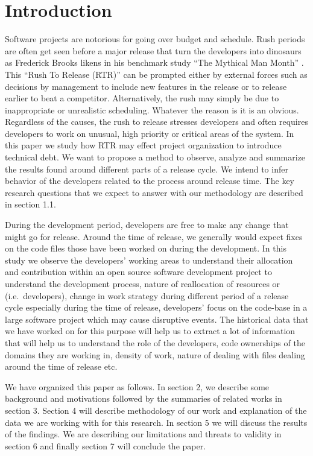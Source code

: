 \documentclass{acm_proc_article-sp}
\begin{document}
\section{Introduction}
Software projects are notorious for going over budget and schedule. Rush periods are often get seen before a major release that turn the developers into dinosaurs as Frederick Brooks likens in his benchmark study ``The Mythical Man Month'' \cite{brooks_mythical}. This ``Rush To Release (RTR)'' can be prompted either by external forces such as decisions by management to include new features in the release or to release earlier to beat a competitor. Alternatively, the rush may simply be due to inappropriate or unrealistic scheduling. Whatever the reason is it is an obvious. Regardless of the causes, the rush to release stresses developers and often requires developers to work on unusual, high priority or critical areas of the system. In this paper we study how RTR may effect project organization to introduce technical debt. We want to propose a method to observe, analyze and summarize the results found around different parts of a release cycle. We intend to infer behavior of the developers related to the process around release time. The key research questions that we expect to answer with our methodology are described in section 1.1.

During the development period, developers are free to make any change that might go for release. Around the time of release, we generally would expect fixes on the code files those have been worked on during the development. In this study we observe the developers' working areas to understand their allocation and contribution within an open source software development project to understand the development process, nature of reallocation of resources or (i.e.\ developers), change in work strategy during different period of a release cycle especially during the time of release, developers' focus on the code-base in a large software project which may cause disruptive events. The historical data that we have worked on for this purpose will help us to extract a lot of information that will help us to understand the role of the developers, code ownerships of the domains they are working in, density of work, nature of dealing with files dealing around the time of release etc.

We have organized this paper as follows. In section 2, we describe some background and motivations followed by the summaries of related works in section 3. Section 4 will describe methodology of our work and explanation of the data we are working with for this research. In section 5 we will discuss the results of the findings. We are describing our limitations and threats to validity in section 6 and finally section 7 will conclude the paper.
\end{document}
